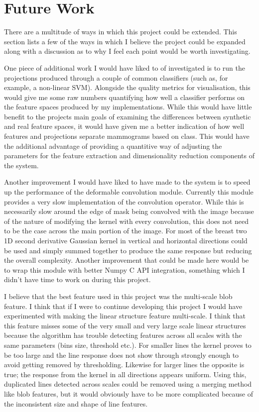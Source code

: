 \section{Future Work}
\label{sec:future-work}
There are a multitude of ways in which this project could be extended. This section lists a few of the ways in which I believe the project could be expanded along with a discussion as to why I feel each point would be worth investigating.

One piece of additional work I would have liked to of investigated is to run the projections produced through a couple of common classifiers (such as, for example, a non-linear SVM). Alongside the quality metrics for visualisation, this would give me some raw numbers quantifying how well a classifier performs on the feature spaces produced by my implementations. While this would have little benefit to the projects main goals of examining the differences between synthetic and real feature spaces, it would have given me a better indication of how well features and projections separate mammograms based on class. This would have the additional advantage of providing a quantitive way of adjusting the parameters for the feature extraction and dimensionality reduction components of the system.

Another improvement I would have liked to have made to the system is to speed up the performance of the deformable convolution module. Currently this module provides a very slow implementation of the convolution operator. While this is necessarily slow around the edge of mask being convolved with the image because of the nature of modifying the kernel with every convolution, this does not need to be the case across the main portion of the image. For most of the breast two 1D second derivative Gaussian kernel in vertical and horizontal directions could be used and simply summed together to produce the same response but reducing the overall complexity. Another improvement that could be made here would be to wrap this module with better Numpy C API integration, something which I didn't have time to work on during this project.

I believe that the best feature used in this project was the multi-scale blob feature. I think that if I were to continue developing this project I would have experimented with making the linear structure feature multi-scale. I think that this feature misses some of the very small and very large scale linear structures because the algorithm has trouble detecting features across all scales with the same parameters (bins size, threshold etc.). For smaller lines the kernel proves to be too large and the line response does not show through strongly enough to avoid getting removed by thresholding. Likewise for larger lines the opposite is true; the response from the kernel in all directions appears uniform. Using this, duplicated lines detected across scales could be removed using a merging method like blob features, but it would obviously have to be more complicated because of the inconsistent size and shape of line features.

